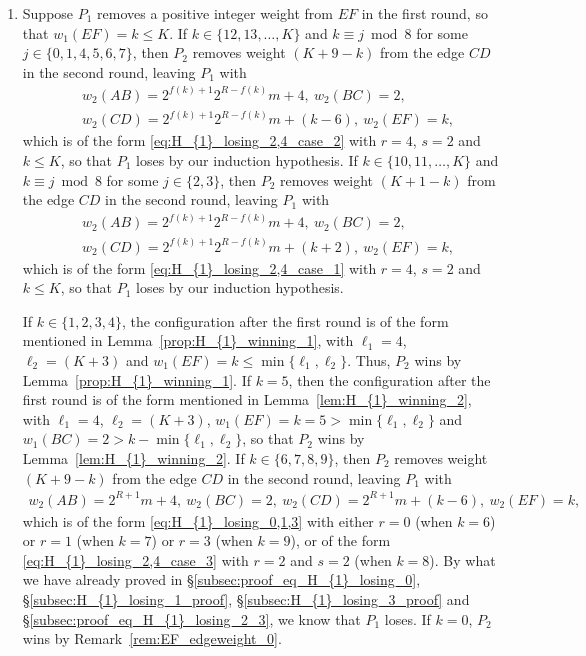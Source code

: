 \documentclass[11pt,reqno]{amsart}
\theoremstyle{definition}
\theoremstyle{definition}
\begin{document}
\begin{enumerate}
\item Suppose $P_{1}$ removes a positive integer weight from $EF$ in the first round, so that $w_{1}(EF)=k \leqslant K$. If $k \in \{12,13,\ldots,K\}$ and $k \equiv j \bmod 8$ for some $j \in \{0,1,4,5,6,7\}$, then $P_{2}$ removes weight $(K+9-k)$ from the edge $CD$ in the second round, leaving $P_{1}$ with
\begin{align}
{}&w_{2}(AB)=2^{f(k)+1}2^{R-f(k)}m+4,\ w_{2}(BC)=2,\nonumber\\
{}&w_{2}(CD)=2^{f(k)+1}2^{R-f(k)}m+(k-6),\ w_{2}(EF)=k,\nonumber
\end{align}
which is of the form \eqref{eq:H_{1}_losing_2,4_case_2} with $r=4$, $s=2$ and $k \leqslant K$, so that $P_{1}$ loses by our induction hypothesis. If $k \in \{10,11,\ldots,K\}$ and $k \equiv j \bmod 8$ for some $j \in \{2,3\}$, then $P_{2}$ removes weight $(K+1-k)$ from the edge $CD$ in the second round, leaving $P_{1}$ with
\begin{align}
{}&w_{2}(AB)=2^{f(k)+1}2^{R-f(k)}m+4,\ w_{2}(BC)=2,\nonumber\\
{}&w_{2}(CD)=2^{f(k)+1}2^{R-f(k)}m+(k+2),\ w_{2}(EF)=k,\nonumber
\end{align}
which is of the form \eqref{eq:H_{1}_losing_2,4_case_1} with $r=4$, $s=2$ and $k \leqslant K$, so that $P_{1}$ loses by our induction hypothesis.  

If $k \in \{1,2,3,4\}$, the configuration after the first round is of the form mentioned in Lemma~\ref{prop:H_{1}_winning_1}, with $\ell_{1}=4$, $\ell_{2}=(K+3)$ and $w_{1}(EF)=k \leqslant \min\{\ell_{1},\ell_{2}\}$. Thus, $P_{2}$ wins by Lemma~\ref{prop:H_{1}_winning_1}. If $k=5$, then the configuration after the first round is of the form mentioned in Lemma~\ref{lem:H_{1}_winning_2}, with $\ell_{1}=4$, $\ell_{2}=(K+3)$, $w_{1}(EF)=k=5>\min\{\ell_{1},\ell_{2}\}$ and $w_{1}(BC)=2>k-\min\{\ell_{1},\ell_{2}\}$, so that $P_{2}$ wins by Lemma~\ref{lem:H_{1}_winning_2}. If $k \in \{6,7,8,9\}$, then $P_{2}$ removes weight $(K+9-k)$ from the edge $CD$ in the second round, leaving $P_{1}$ with
\begin{align}
w_{2}(AB)=2^{R+1}m+4,\ w_{2}(BC)=2,\ w_{2}(CD)=2^{R+1}m+(k-6),\ w_{2}(EF)=k,\nonumber
\end{align}
which is of the form \eqref{eq:H_{1}_losing_0,1,3} with either $r=0$ (when $k=6$) or $r=1$ (when $k=7$) or $r=3$ (when $k=9$), or of the form \eqref{eq:H_{1}_losing_2,4_case_3} with $r=2$ and $s=2$ (when $k=8$). By what we have already proved in \S\ref{subsec:proof_eq_H_{1}_losing_0}, \S\ref{subsec:H_{1}_losing_1_proof}, \S\ref{subsec:H_{1}_losing_3_proof} and \S\ref{subsec:proof_eq_H_{1}_losing_2_3}, we know that $P_{1}$ loses. If $k=0$, $P_{2}$ wins by Remark~\ref{rem:EF_edgeweight_0}.


\end{enumerate}
\end{document}
